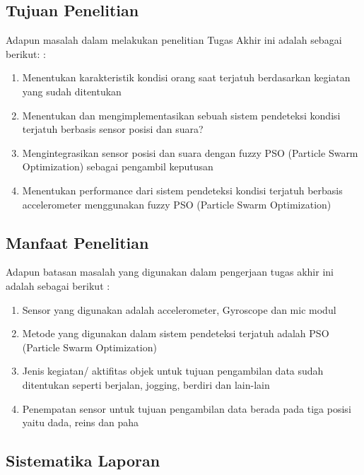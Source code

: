 \documentclass[11pt]{article}
\begin{document}
	
	
	\subsection{Tujuan Penelitian}
	
		Adapun masalah dalam melakukan penelitian Tugas Akhir ini adalah sebagai berikut: :
	
	\begin{enumerate}[label=\alph*.]
		\item Menentukan karakteristik kondisi orang saat terjatuh berdasarkan kegiatan yang sudah ditentukan
		\item Menentukan dan mengimplementasikan sebuah sistem pendeteksi kondisi terjatuh berbasis sensor posisi dan suara?
		\item Mengintegrasikan sensor posisi dan suara dengan fuzzy PSO (Particle Swarm Optimization) sebagai pengambil keputusan
		\item Menentukan performance dari sistem pendeteksi kondisi terjatuh berbasis accelerometer menggunakan fuzzy PSO (Particle Swarm Optimization)
		
	\end{enumerate}
	
	
	\subsection{Manfaat Penelitian}
	
Adapun batasan masalah yang digunakan dalam pengerjaan tugas akhir ini adalah sebagai berikut :
	
	\begin{enumerate}[label=\alph*.]
		
		\item Sensor yang digunakan adalah accelerometer, Gyroscope dan mic modul
		\item Metode yang digunakan dalam sistem pendeteksi terjatuh adalah PSO (Particle Swarm Optimization)
		\item Jenis kegiatan/ aktifitas objek untuk tujuan pengambilan data sudah ditentukan seperti berjalan, jogging, berdiri dan lain-lain
		\item Penempatan sensor untuk tujuan pengambilan data berada pada tiga posisi yaitu dada, reins dan paha
		
	\end{enumerate}

	\subsection{Sistematika Laporan}
\end{document}
